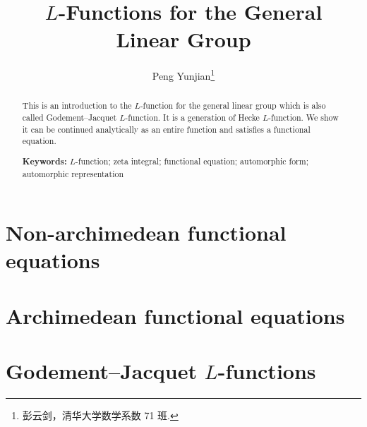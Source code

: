 \documentclass[twoside]{article}
\begin{document}
\title{$L$-Functions for the General \\ Linear Group}
\author{Peng Yunjian\footnote{彭云剑，清华大学数学系数 71 班.}}

\begin{abstract}
  This is an introduction to the $L$-function for the general linear group which is also called Godement--Jacquet $L$-function. It is a generation of Hecke $L$-function. We show it can be continued analytically as an entire function and satisfies a functional equation. 
  
  \bigskip
  \noindent
  \textbf{Keywords:} $L$-function; zeta integral; functional equation; automorphic form; automorphic representation
\end{abstract}

\tableofcontents

\section{Non-archimedean functional equations}






\section{Archimedean functional equations}




\section{Godement--Jacquet \texorpdfstring{$L$}{L}-functions}






\printbibliography
\end{document}
